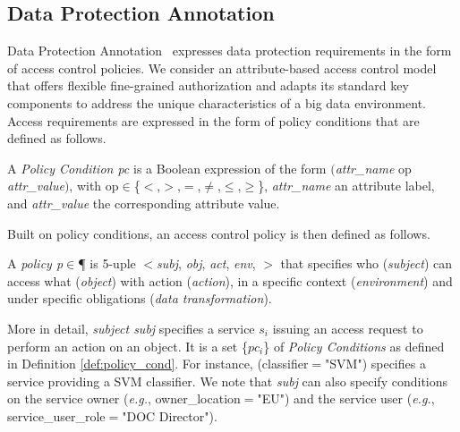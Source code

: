       \subsection{Data Protection Annotation}\label{sec:nonfuncannotation}
      Data Protection Annotation \myLambda\ expresses data protection requirements in the form of access control policies. We consider an attribute-based access control model that offers flexible fine-grained authorization and adapts its standard key components to address the unique characteristics of a big data environment. Access requirements are expressed in the form of policy conditions that are defined as follows.
      
      \vspace{0.5em}
      
      \begin{definition}\label{def:policy_cond}
        A \emph{Policy Condition pc} is a Boolean expression of the form $($\emph{attr\_name} op \emph{attr\_value}$)$, with op$\in$\{$<$,$>$,$=$,$\neq$,$\leq$,$\geq$\}, \emph{attr\_name} an attribute label, and \emph{attr\_value} the corresponding attribute value.
      \end{definition}
      
      \vspace{0.5em}
      
      Built on policy conditions, an access control policy is then defined as follows.
      \vspace{0.5em}
      \begin{definition}[Policy]\label{def:policy_rule}
        A {\it policy p}$\in$\P{} is 5-uple $<$\textit{subj}, \textit{obj}, \textit{act}, \textit{env}, \textit{\TP}$>$ that specifies who (\emph{subject}) can access what (\emph{object}) with action (\emph{action}), in a specific context (\emph{environment}) and under specific obligations (\emph{data transformation}).
      \end{definition}

      \vspace{0.5em}

      More in detail, \textit{subject subj} specifies a service $s_i$ issuing an access request to perform an action on an object. It is a set \{$pc_i$\} of \emph{Policy Conditions} as defined in Definition \ref{def:policy_cond}. For instance, (classifier$=$"SVM") specifies a service providing a SVM classifier. We note that \textit{subj} can also specify conditions on the service owner (\textit{e.g.}, owner\_location$=$"EU") and the service user (\textit{e.g.}, service\_user\_role$=$"DOC Director").

